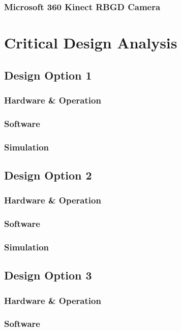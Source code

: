 \documentclass[a4paper]{article}
\begin{document}
\subsubsection{Microsoft 360 Kinect RBGD Camera}

\section{Critical Design Analysis}

\subsection{Design Option 1}
\subsubsection{Hardware \& Operation}
\subsubsection{Software}
\subsubsection{Simulation}

\subsection{Design Option 2}
\subsubsection{Hardware \& Operation}
\subsubsection{Software}
\subsubsection{Simulation}

\subsection{Design Option 3}
\subsubsection{Hardware \& Operation}
\subsubsection{Software}
\end{document}
